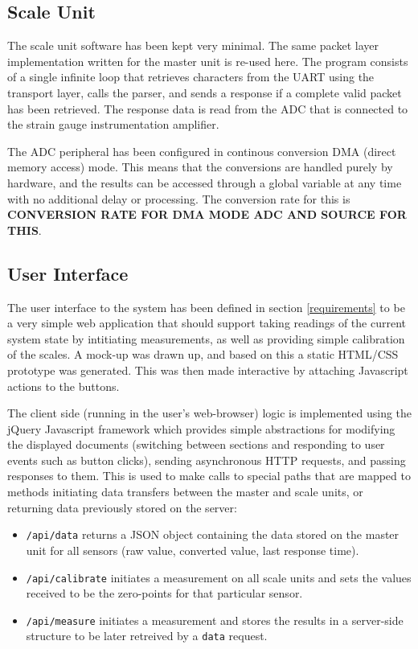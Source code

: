 \subsection{Scale Unit}
The scale unit software has been kept very minimal. The same packet layer implementation written for the master unit is re-used here. The program consists of a single infinite loop that retrieves characters from the UART using the transport layer, calls the parser, and sends a response if a complete valid packet has been retrieved. The response data is read from the ADC that is connected to the strain gauge instrumentation amplifier.

The ADC peripheral has been configured in continous conversion DMA (direct memory access) mode. This means that the conversions are handled purely by hardware, and the results can be accessed through a global variable at any time with no additional delay or processing. The conversion rate for this is \textbf{CONVERSION RATE FOR DMA MODE ADC AND SOURCE FOR THIS}.


\subsection{User Interface}
The user interface to the system has been defined in section \ref{requirements} to be a very simple web application that should support taking readings of the current system state by intitiating measurements, as well as providing simple calibration of the scales. A mock-up was drawn up, and based on this a static HTML/CSS prototype was generated. This was then made interactive by attaching Javascript actions to the buttons.

The client side (running in the user's web-browser) logic is implemented using the jQuery Javascript framework \cite{jquery} which provides simple abstractions for modifying the displayed documents (switching between sections and responding to user events such as button clicks), sending asynchronous HTTP requests, and passing responses to them. This is used to make calls to special paths that are mapped to methods initiating data transfers between the master and scale units, or returning data previously stored on the server:

\begin{itemize}
	\item \texttt{/api/data} returns a JSON \cite{json-spec} object containing the data stored on the master unit for all sensors (raw value, converted value, last response time).
	\item \texttt{/api/calibrate} initiates a measurement on all scale units and sets the values received to be the zero-points for that particular sensor.
	\item \texttt{/api/measure} initiates a measurement and stores the results in a server-side structure to be later retreived by a \texttt{data} request.
\end{itemize}

